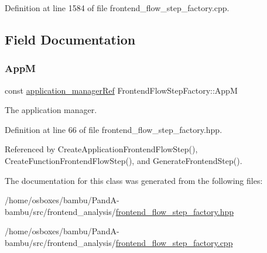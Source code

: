 Definition at line 1584 of file frontend\+\_\+flow\+\_\+step\+\_\+factory.\+cpp.



\subsection{Field Documentation}
\mbox{\label{classFrontendFlowStepFactory_ae382b19905edb984bb595f22dca874d3}} 
\subsubsection{\texorpdfstring{AppM}{AppM}}
{\footnotesize\ttfamily const \hyperlink{application__manager_8hpp_a04ccad4e5ee401e8934306672082c180}{application\+\_\+manager\+Ref} Frontend\+Flow\+Step\+Factory\+::\+AppM\hspace{0.3cm}{\ttfamily [protected]}}



The application manager. 



Definition at line 66 of file frontend\+\_\+flow\+\_\+step\+\_\+factory.\+hpp.



Referenced by Create\+Application\+Frontend\+Flow\+Step(), Create\+Function\+Frontend\+Flow\+Step(), and Generate\+Frontend\+Step().



The documentation for this class was generated from the following files\+:\begin{DoxyCompactItemize}
\item 
/home/osboxes/bambu/\+Pand\+A-\/bambu/src/frontend\+\_\+analysis/\hyperlink{frontend__flow__step__factory_8hpp}{frontend\+\_\+flow\+\_\+step\+\_\+factory.\+hpp}\item 
/home/osboxes/bambu/\+Pand\+A-\/bambu/src/frontend\+\_\+analysis/\hyperlink{frontend__flow__step__factory_8cpp}{frontend\+\_\+flow\+\_\+step\+\_\+factory.\+cpp}\end{DoxyCompactItemize}
